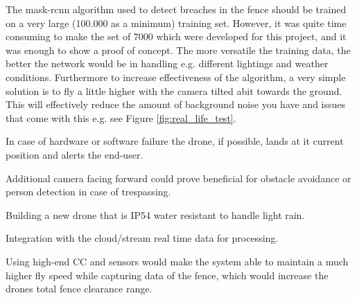 \documentclass[../Head/Main.tex]{subfiles}
\begin{document}
The mask-rcnn algorithm used to detect breaches in the fence should be trained on a very large (100.000 as a minimum) training set. However, it was quite time consuming to make the set of 7000 which were developed for this project, and it was enough to show a proof of concept. The more versatile the training data, the better the network would be in handling e.g. different lightings and weather conditions. Furthermore to increase effectiveness of the algorithm, a very simple solution is to fly a little higher with the camera tilted abit towards the ground. This will effectively reduce the amount of background noise you have and issues that come with this e.g. see Figure  \ref{fig:real_life_test}.

In case of hardware or software failure the drone, if possible, lands at it current position and alerts the end-user. 

Additional camera facing forward could prove beneficial for obstacle avoidance or person detection in case of trespassing. 

Building a new drone that is IP54 water resistant to handle light rain.

Integration with the cloud/stream real time data for processing.

Using high-end CC and sensors would make the system able to maintain a much higher fly speed while capturing data of the fence, which would increase the drones total fence clearance range.
\end{document}
